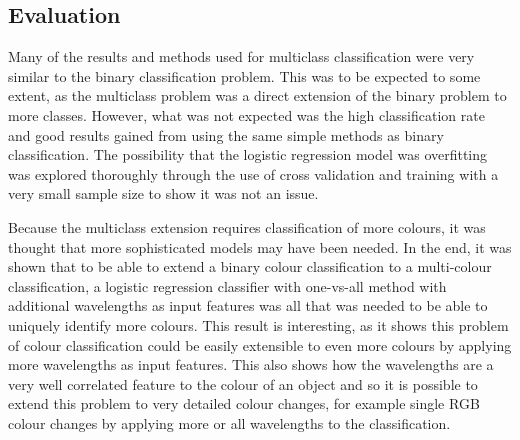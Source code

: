 \documentclass{article}
\begin{document}
\subsection{Evaluation}
Many of the results and methods used for multiclass classification were very similar to the binary classification problem. This was to be expected to some extent, as the multiclass problem was a direct extension of the binary problem to more classes. However, what was not expected was the high classification rate and good results gained from using the same simple methods as binary classification. The possibility that the logistic regression model was overfitting was explored thoroughly through the use of cross validation and training with a very small sample size to show it was not an issue. 

Because the multiclass extension requires classification of more colours, it was thought that more sophisticated models may have been needed. In the end, it was shown that to be able to extend a binary colour classification to a multi-colour classification, a logistic regression classifier with one-vs-all method with additional wavelengths as input features was all that was needed to be able to uniquely identify more colours. This result is interesting, as it shows this problem of colour classification could be easily extensible to even more colours by applying more wavelengths as input features. This also shows how the wavelengths are a very well correlated feature to the colour of an object and so it is possible to extend this problem to very detailed colour changes, for example single RGB colour changes by applying more or all wavelengths to the classification. 
\end{document}
